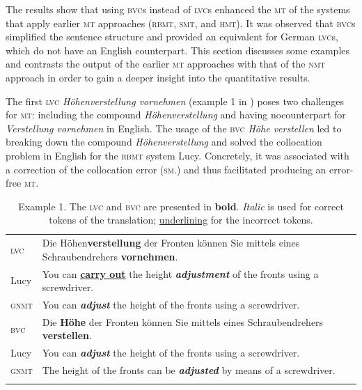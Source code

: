 \documentclass[output=paper]{langsci/langscibook}
\begin{document}
The results show that using \textsc{bvc}s instead of \textsc{lvc}s enhanced the \textsc{mt} of the systems that apply earlier \textsc{mt} approaches (\textsc{rbmt}, \textsc{smt}, and \textsc{hmt}). It was observed that \textsc{bvc}s simplified the sentence structure and provided an equivalent for German \textsc{lvc}s, which do not have an English counterpart. This section discusses some examples and contrasts the output of the earlier \textsc{mt} approaches with that of the \textsc{nmt} approach in order to gain a deeper insight into the quantitative results.

The first \textsc{lvc} \textit{Höhenverstellung vornehmen} (example 1 in ) poses two challenges for \textsc{mt}: including the compound \textit{Höhenverstellung} and having no\linebreak counterpart for \textit{Verstellung vornehmen} in English. The usage of the \textsc{bvc} \textit{Höhe verstellen} led to breaking down the compound \textit{Höhenverstellung} and solved the collocation problem in English for the \textsc{rbmt} system Lucy. Concretely, it was associated with a correction of the collocation error (\textsc{sm}.) and thus facilitated producing an error-free \textsc{mt}.\pagebreak

\begin{table}[p]
\caption{Example 1. The \textsc{lvc} and \textsc{bvc} are presented in \textbf{bold}. \textit{Italic} is used for correct tokens of the translation; \uline{underlining} for the incorrect tokens.\label{marzouk:table2}}
\begin{tabularx}{\textwidth}{lQ}
\lsptoprule
\textsc{lvc} & Die Höhen\textbf{verstellung} der Fronten können Sie mittels eines Schraubendrehers \textbf{vornehmen}.\\
Lucy &You can \uline{\textbf{carry out}} the height \textit{ \textbf{adjustment}} of the fronts using a screwdriver.\\
\textsc{gnmt}&You can \textit{\textbf{adjust}} the height of the fronts using a screwdriver.\\
\midrule
\textsc{bvc}&Die \textbf{Höhe} der Fronten können Sie mittels eines Schraubendrehers \textbf{verstellen}.\\
Lucy&You can \textit{\textbf{adjust}} the height of the fronts using a screwdriver.\\
\textsc{gnmt}&The height of the fronts can be \textit{\textbf{adjusted}} by means of a screwdriver.\\
\lspbottomrule
\end{tabularx}
\end{table}
\end{document}
